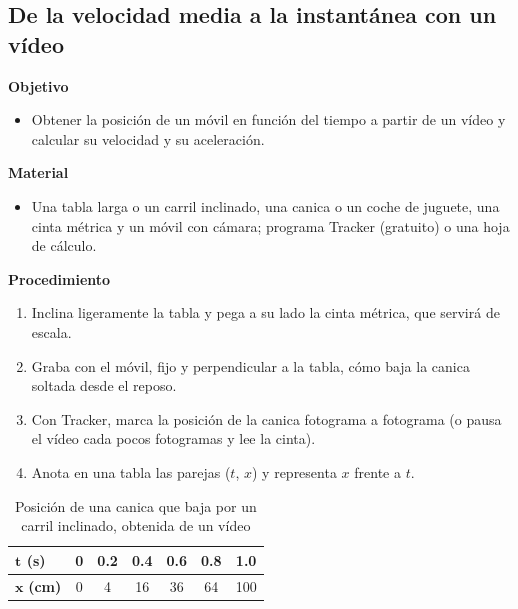 \subsection{De la velocidad media a la instantánea con un vídeo}

\noindent\begin{minipage}[t]{0.48\textwidth}
    \textbf{Objetivo}
    \begin{itemize}
        \item Obtener la posición de un móvil en función del tiempo a partir de un vídeo y calcular su velocidad y su aceleración.
    \end{itemize}
\end{minipage}\hfill
\begin{minipage}[t]{0.48\textwidth}
    \textbf{Material}
    \begin{itemize}
        \item Una tabla larga o un carril inclinado, una canica o un coche de juguete, una cinta métrica y un móvil con cámara;
        programa Tracker (gratuito) o una hoja de cálculo.
    \end{itemize}
\end{minipage}

\textbf{Procedimiento}
\begin{enumerate}[label=\numberballgreen]
    \item Inclina ligeramente la tabla y pega a su lado la cinta métrica, que servirá de escala.
    \item Graba con el móvil, fijo y perpendicular a la tabla, cómo baja la canica soltada desde el reposo.
    \item Con Tracker, marca la posición de la canica fotograma a fotograma (o pausa el vídeo cada pocos fotogramas y lee la cinta).
    \item Anota en una tabla las parejas (\(t\), \(x\)) y representa \(x\) frente a \(t\).
\end{enumerate}

\begin{table}[H]
    \centering
    \caption{Posición de una canica que baja por un carril inclinado, obtenida de un vídeo}
    \vspace{-5pt}
    \begin{tabular}{@{}lcccccc@{}}
        \toprule
        \(\boldsymbol{t}\) \textbf{(s)} & 0 & \num{0.2} & \num{0.4} & \num{0.6} & \num{0.8} & \num{1.0} \\
        \midrule
        \(\boldsymbol{x}\) \textbf{(cm)} & 0 & 4 & 16 & 36 & 64 & 100 \\
        \bottomrule
    \end{tabular}
    \label{tab:ud8-canica}
\end{table}

